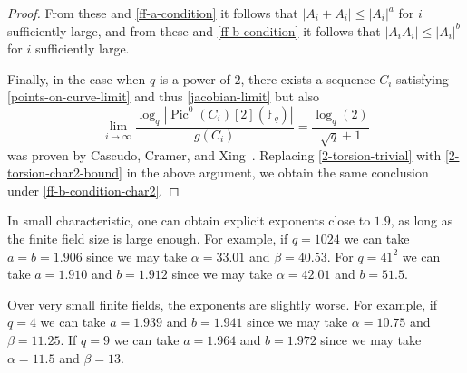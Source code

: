 \documentclass{amsart}
\numberwithin{equation}{section}
\begin{document}
\begin{proof}
From these and \eqref{ff-a-condition} it follows that $|A_i+A_i|\leq |A_i|^a$ for $i$ sufficiently large, and from these and \eqref{ff-b-condition} it follows that $|A_i A_i| \leq |A_i|^b$ for $i$ sufficiently large.

Finally, in the case when $q$ is a power of $2$,  there exists a sequence $C_i$ satisfying \eqref{points-on-curve-limit} and thus \eqref{jacobian-limit} but also
\begin{equation}\label{2-torsion-char2-bound} \lim_{i \to \infty} \frac{\log_q  |\operatorname{Pic}^0(C_i)[2](\mathbb F_q)|}{g(C_i)} = \frac{\log_q(2)}{\sqrt{q}+1} \end{equation} was proven by Cascudo, Cramer, and Xing~\cite[Theorem 2.3(iii)]{CCX}. Replacing \eqref{2-torsion-trivial} with \eqref{2-torsion-char2-bound} in the above argument, we obtain the same conclusion under \eqref{ff-b-condition-char2}. \end{proof}


 
 In small characteristic, one can obtain explicit exponents close to $1.9$, as long as the finite field size is large enough. For example, if $q=1024$ we can take $a=b=1.906$ since we may take $\alpha=33.01$ and $\beta=40.53$. For $q=41^2$ we can take $a=1.910$ and $b=1.912$ since we may take $\alpha=42.01$ and $b=51.5$.
 
 Over very small finite fields, the exponents are slightly worse. For example, if $q=4$ we can take  $ a=1.939$ and $b=1.941$ since we may take $\alpha=10.75$ and $\beta=11.25$. If $q=9$ we can take $a=1.964$ and $b=1.972$ since we may take $\alpha=11.5$ and $\beta=13$. 

 


\end{document}
